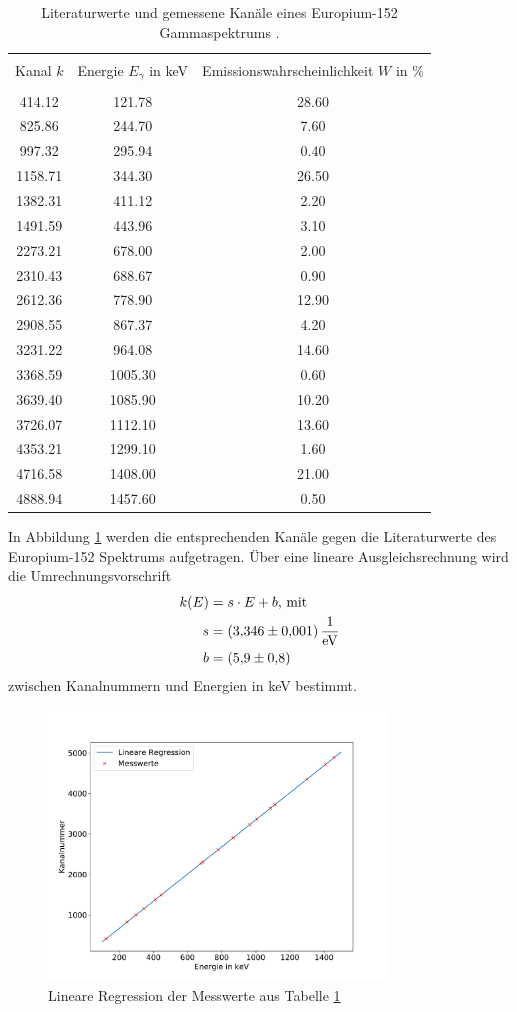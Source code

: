 \begin{table}
\centering
\caption{Literaturwerte und gemessene Kanäle eines Europium-152 Gammaspektrums \cite{sample}.}
\begin{tabular}{c c c}
\hline \\
Kanal $k$ &Energie $E_\gamma$ in keV & Emissionswahrscheinlichkeit $W$ in \% \\
\hline \\
414.12 & 121.78 & 28.60 \\ 825.86 & 244.70 & 7.60 \\ 997.32 & 295.94 & 0.40 \\ 1158.71 & 344.30 & 26.50 \\ 1382.31 & 411.12 & 2.20 \\ 1491.59 & 443.96 & 3.10 \\ 2273.21 & 678.00 & 2.00 \\ 2310.43 & 688.67 & 0.90 \\ 2612.36 & 778.90 & 12.90 \\ 2908.55 & 867.37 & 4.20 \\ 3231.22 & 964.08 & 14.60 \\ 3368.59 & 1005.30 & 0.60 \\ 3639.40 & 1085.90 & 10.20 \\ 3726.07 & 1112.10 & 13.60 \\ 4353.21 & 1299.10 & 1.60 \\ 4716.58 & 1408.00 & 21.00 \\ 4888.94 & 1457.60 & 0.50 \\
\hline
\end{tabular}
\label{tab:atab1}
\end{table}
In Abbildung \ref{fig:Kalibrierung} werden die entsprechenden Kanäle gegen die Literaturwerte des Europium-152 Spektrums aufgetragen.
Über eine lineare Ausgleichsrechnung wird die Umrechnungsvorschrift
\begin{align*}
k(E) &= s \cdot E + b \text{, mit}\\
  s &= \SI{3.346+-0.001}{\per\electronvolt}\\
  b &= \SI{ 5.9+-0.8}{}
\end{align*}
zwischen Kanalnummern und Energien in keV bestimmt.
\begin{figure}
\centering
\includegraphics[width=0.8\textwidth]{python/plots/kalibrierung.pdf}
\caption{Lineare Regression der Messwerte aus Tabelle \ref{tab:atab1}}
\label{fig:Kalibrierung}
\end{figure}
